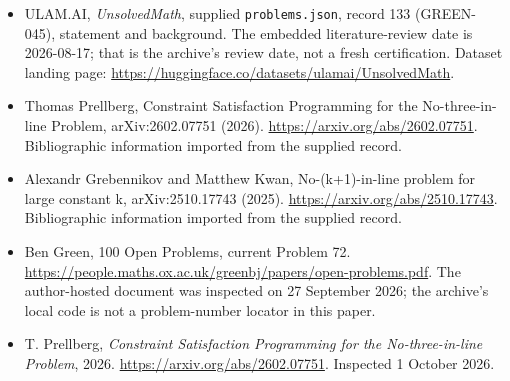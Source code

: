 \documentclass[11pt,a4paper]{article}
\begin{document}
{\small

\begin{itemize}

\item[\hypertarget{source:133:1}{S1}] ULAM.AI, \emph{UnsolvedMath}, supplied \texttt{problems.json}, record 133 (GREEN-045), statement and background. The embedded literature-review date is 2026-08-17; that is the archive’s review date, not a fresh certification. Dataset landing page: \url{https://huggingface.co/datasets/ulamai/UnsolvedMath}.

\item[\hypertarget{source:133:2}{S2}] Thomas Prellberg, Constraint Satisfaction Programming for the No-three-in-line Problem, arXiv:2602.07751 (2026). \url{https://arxiv.org/abs/2602.07751}. Bibliographic information imported from the supplied record.

\item[\hypertarget{source:133:3}{S3}] Alexandr Grebennikov and Matthew Kwan, No-(k+1)-in-line problem for large constant k, arXiv:2510.17743 (2025). \url{https://arxiv.org/abs/2510.17743}. Bibliographic information imported from the supplied record.

\item[\hypertarget{source:133:4}{S4}] Ben Green, 100 Open Problems, current Problem 72. \url{https://people.maths.ox.ac.uk/greenbj/papers/open-problems.pdf}. The author-hosted document was inspected on 27 September 2026; the archive’s local code is not a problem-number locator in this paper.

\item[E1] T. Prellberg, \emph{Constraint Satisfaction Programming for the No-three-in-line Problem}, 2026. \url{https://arxiv.org/abs/2602.07751}. Inspected 1 October 2026.

\end{itemize}

}

\label{end:133}
\end{document}
